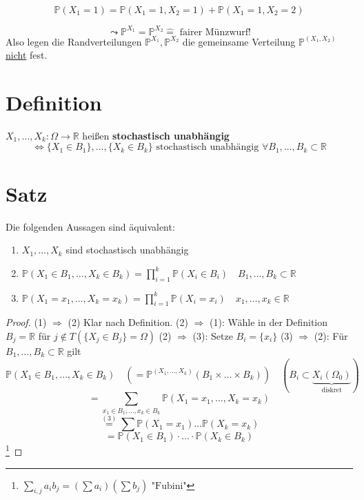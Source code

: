 \documentclass[a4paper,11pt,notitlepage]{report}
\newcommand{\R}{{\ensuremath{\mathbb{R}}}}
\newcommand{\Prim}{{\ensuremath{\mathbb{P}}}}
\begin{document}
$$\Prim(X_1 = 1) = \Prim(X_1 = 1, X_2 = 1)+\Prim(X_1 = 1, X_2 = 2)$$

$$\leadsto \Prim^{X_1} = \Prim^{X_2} \hat{=} \text{ fairer Münzwurf!}$$
Also legen die Randverteilungen $\Prim^{X_1}, \Prim^{X_2}$ die gemeinsame Verteilung $\Prim^{(X_1,X_2)}$ \underline{nicht} fest.

\section{Definition}
$X_1, \ldots, X_k \colon \Omega \rightarrow \R$ heißen \textbf{stochastisch unabhängig}
$$\Leftrightarrow \{X_1 \in B_1\}, \ldots, \{X_k \in B_k\} \text{ stochastisch unabhängig } \forall B_1, \ldots, B_k \subset \R$$

\section{Satz}
Die folgenden Aussagen sind äquivalent:
\begin{enumerate}
	\item $X_1, \ldots, X_k$ sind stochastisch unabhängig
	\item $\Prim(X_1 \in B_1, \ldots, X_k \in B_k) = \prod\limits_{i=1}^k{\Prim(X_i \in B_i)} \quad B_1, \ldots, B_k \subset \R$
	\item $\Prim(X_1 = x_1, \ldots, X_k = x_k) = \prod\limits_{i=1}^k{\Prim(X_i = x_i)} \quad x_1, \ldots, x_k \in \R$
\end{enumerate}

\begin{proof}
	(1) $\Rightarrow$ (2) Klar nach Definition.
	\newline
	(2) $\Rightarrow$ (1): Wähle in der Definition $B_j = \R$ für $j \notin T (\{X_j \in B_j\} = \Omega)$
	\newline
	(2) $\Rightarrow$ (3): Setze $B_i = \{x_i\}$
	\newline
	(3) $\Rightarrow$ (2): Für $B_1, \ldots, B_k \subset \R$ gilt
		$$\Prim(X_1 \in B_1, \ldots, X_k \in B_k) \quad (=\Prim^{(X_1,\ldots,X_k)}(B_1 \times \ldots \times B_k)) \quad (B_i \subset \underbrace{X_i(\Omega_0)}_{\text{diskret}})$$
		$$= \sum\limits_{x_1 \in B_1, \ldots, x_k \in B_k}{\Prim(X_1 = x_1, \ldots, X_k = x_k)}$$
		$$\overset{(3)}{=} \sum{\Prim(X_1 = x_1) \ldots \Prim(X_k = x_k)}$$
		$$= \Prim(X_1 \in B_1) \cdot \ldots \cdot \Prim(X_k \in B_k)$$\footnote{$\sum\limits_{i,j}{a_ib_j} = (\sum{a_i})(\sum{b_j}) \text{ "Fubini"}$}
\end{proof}
\end{document}
